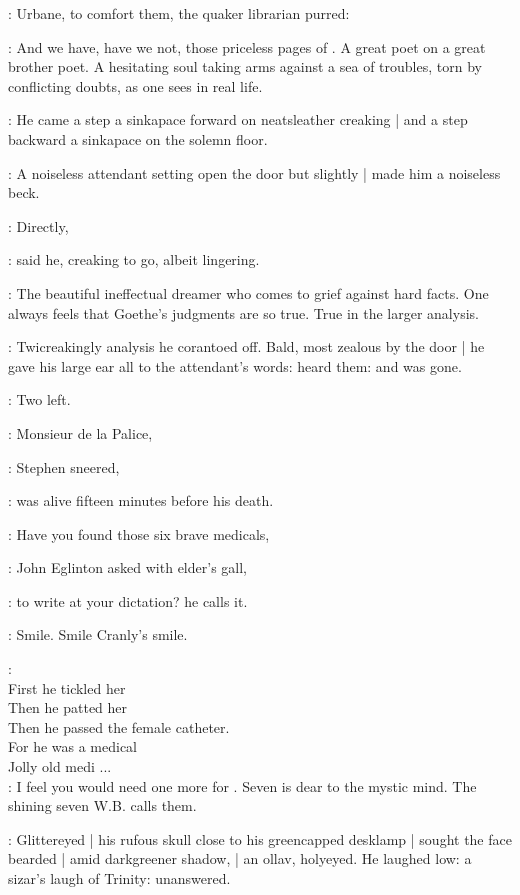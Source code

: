 :
Urbane, to comfort them,
the quaker librarian purred:

\librarian:
And we have, have we not, those priceless pages of .
A great poet on a great brother poet.
A hesitating soul taking arms against a sea of troubles,
torn by conflicting doubts,
as one sees in real life.

:
He came a step a sinkapace forward
on neatsleather creaking |
and a step backward a sinkapace
on the solemn floor.

:
A noiseless attendant setting open the door but slightly |
made him a noiseless beck.

\librarian:
Directly,

:
said he,
creaking to go, albeit lingering.

\librarian:
The beautiful ineffectual dreamer who comes to grief against hard facts.
One always feels that Goethe's judgments are so true.
True in the larger analysis.

:
Twicreakingly analysis he corantoed off.
Bald, most zealous by the door |
he gave his large ear all to the attendant's words:
heard them: and was gone.

\StephenInt:
Two left.

\Stephen:
Monsieur de la Palice,

:
Stephen sneered,

\Stephen:
was alive fifteen minutes before his death.

\eglinton:
Have you found those six brave medicals,

:
John Eglinton asked with elder's gall,

\eglinton:
to write  at your dictation?
he calls it.

\StephenInt:
Smile. Smile Cranly's smile.

\StephenInt: \\
    First he tickled her \\
    Then he patted her \\
    Then he passed the female catheter. \\
    For he was a medical \\
    Jolly old medi ... \\

\eglinton:
I feel you would need one more for .
Seven is dear to the mystic mind.
The shining seven W.B. calls them.

:
Glittereyed |
his rufous skull close to his greencapped desklamp |
sought the face bearded |
amid darkgreener shadow, |
an ollav, holyeyed.
He laughed low: a sizar's laugh of Trinity: unanswered.

